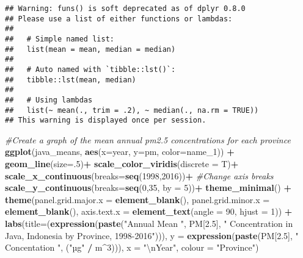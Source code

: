 \documentclass[]{article}
\newenvironment{Shaded}{\begin{snugshade}}{\end{snugshade}}
\newcommand{\CharTok}[1]{\textcolor[rgb]{0.31,0.60,0.02}{#1}}
\newcommand{\CommentTok}[1]{\textcolor[rgb]{0.56,0.35,0.01}{\textit{#1}}}
\newcommand{\DataTypeTok}[1]{\textcolor[rgb]{0.13,0.29,0.53}{#1}}
\newcommand{\DecValTok}[1]{\textcolor[rgb]{0.00,0.00,0.81}{#1}}
\newcommand{\FloatTok}[1]{\textcolor[rgb]{0.00,0.00,0.81}{#1}}
\newcommand{\KeywordTok}[1]{\textcolor[rgb]{0.13,0.29,0.53}{\textbf{#1}}}
\newcommand{\NormalTok}[1]{#1}
\newcommand{\OperatorTok}[1]{\textcolor[rgb]{0.81,0.36,0.00}{\textbf{#1}}}
\newcommand{\StringTok}[1]{\textcolor[rgb]{0.31,0.60,0.02}{#1}}
\begin{document}
\begin{verbatim}
## Warning: funs() is soft deprecated as of dplyr 0.8.0
## Please use a list of either functions or lambdas: 
## 
##   # Simple named list: 
##   list(mean = mean, median = median)
## 
##   # Auto named with `tibble::lst()`: 
##   tibble::lst(mean, median)
## 
##   # Using lambdas
##   list(~ mean(., trim = .2), ~ median(., na.rm = TRUE))
## This warning is displayed once per session.
\end{verbatim}

\begin{Shaded}
\begin{Highlighting}[]
\CommentTok{#Create a graph of the mean annual pm2.5 concentrations for each province}
\KeywordTok{ggplot}\NormalTok{(java_means, }\KeywordTok{aes}\NormalTok{(}\DataTypeTok{x=}\NormalTok{year, }\DataTypeTok{y=}\NormalTok{pm, }\DataTypeTok{color=}\NormalTok{name_}\DecValTok{1}\NormalTok{)) }\OperatorTok{+}\StringTok{ }
\StringTok{    }\KeywordTok{geom_line}\NormalTok{(}\DataTypeTok{size=}\NormalTok{.}\DecValTok{5}\NormalTok{)}\OperatorTok{+}
\StringTok{    }\KeywordTok{scale_color_viridis}\NormalTok{(}\DataTypeTok{discrete =}\NormalTok{ T)}\OperatorTok{+}
\StringTok{    }\KeywordTok{scale_x_continuous}\NormalTok{(}\DataTypeTok{breaks=}\KeywordTok{seq}\NormalTok{(}\DecValTok{1998}\NormalTok{,}\DecValTok{2016}\NormalTok{))}\OperatorTok{+}\StringTok{ }\CommentTok{#Change axis breaks}
\StringTok{    }\KeywordTok{scale_y_continuous}\NormalTok{(}\DataTypeTok{breaks=}\KeywordTok{seq}\NormalTok{(}\DecValTok{0}\NormalTok{,}\DecValTok{35}\NormalTok{, }\DataTypeTok{by =} \DecValTok{5}\NormalTok{))}\OperatorTok{+}
\StringTok{    }\KeywordTok{theme_minimal}\NormalTok{() }\OperatorTok{+}
\StringTok{    }\KeywordTok{theme}\NormalTok{(}\DataTypeTok{panel.grid.major.x =} \KeywordTok{element_blank}\NormalTok{(), }
          \DataTypeTok{panel.grid.minor.x =} \KeywordTok{element_blank}\NormalTok{(),}
          \DataTypeTok{axis.text.x =} \KeywordTok{element_text}\NormalTok{(}\DataTypeTok{angle =} \DecValTok{90}\NormalTok{, }\DataTypeTok{hjust =} \DecValTok{1}\NormalTok{)) }\OperatorTok{+}
\StringTok{    }\KeywordTok{labs}\NormalTok{(}\DataTypeTok{title=}\NormalTok{(}\KeywordTok{expression}\NormalTok{(}\KeywordTok{paste}\NormalTok{(}\StringTok{"Annual Mean "}\NormalTok{, PM[}\FloatTok{2.5}\NormalTok{], }\StringTok{" Concentration in Java, Indonesia by Province, 1998-2016"}\NormalTok{))),}
         \DataTypeTok{y =} \KeywordTok{expression}\NormalTok{(}\KeywordTok{paste}\NormalTok{(PM[}\FloatTok{2.5}\NormalTok{], }\StringTok{" Concentation "}\NormalTok{, (}\StringTok{"µg"} \OperatorTok{/}\StringTok{ }\NormalTok{m}\OperatorTok{^}\DecValTok{3}\NormalTok{))),}
         \DataTypeTok{x =} \StringTok{"}\CharTok{\textbackslash{}n}\StringTok{Year"}\NormalTok{,}
         \DataTypeTok{colour =} \StringTok{"Province"}\NormalTok{)}
\end{Highlighting}
\end{Shaded}
\end{document}
